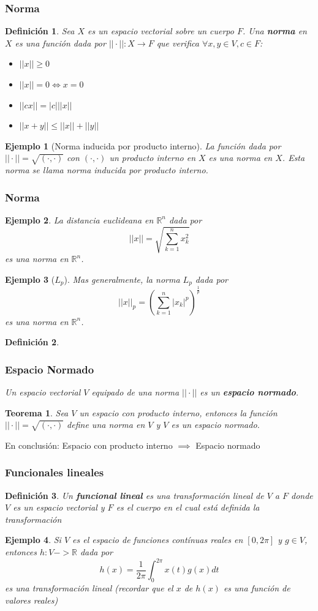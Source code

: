 \documentclass{beamer}
\newtheorem{teo}{Teorema}
\newtheorem{defi}{Definición}
\newtheorem{ejemplo}{Ejemplo}
\begin{document}
\begin{frame}
\frametitle{Norma}
\begin{defi}
Sea $X$ es un espacio vectorial sobre un cuerpo $F$. Una \textbf{norma} en $X$
es una función dada por $|| \cdot || : X \to F$ que verifica $\forall x,y \in V, c \in F$:
\begin{itemize}
\item $||x|| \geq 0$
\item $||x|| = 0 \iff x = 0$
\item $||c x|| = |c| ||x||$
\item $||x + y|| \leq ||x|| + ||y||$
\end{itemize}
\end{defi}
\pause
    \begin{ejemplo}[Norma inducida por producto interno]
        La función dada por $|| \cdot || = \sqrt{( \cdot, \cdot )}$ con $( \cdot, \cdot )$
        un producto interno en $X$ es una norma en $X$. Esta norma
        se llama norma inducida por producto interno.
    \end{ejemplo}
\end{frame}
\begin{frame}
\frametitle{Norma}
\begin{ejemplo}
La distancia euclideana en $\mathbb{R}^n$ dada por
$$
||x|| = \sqrt{\sum_{k=1}^n x_k^2}
$$
es una norma en $\mathbb{R}^n$.
\end{ejemplo}
\pause
\begin{ejemplo}[$L_p$]
Mas generalmente, la norma $L_p$ dada por
$$
||x||_p = (\sum_{k=1}^n |x_k|^p)^{\frac{1}{p}}
$$
es una norma en $\mathbb{R}^n$.
\end{ejemplo}
\end{frame}
\begin{frame}
\begin{defi}
\frametitle{Espacio Normado}
Un espacio vectorial $V$ equipado de una norma $||\cdot||$ es un \textbf{espacio normado}.
\end{defi}
\pause
\begin{teo}
    Sea $V$ un espacio con producto interno, entonces la función $|| \cdot || = \sqrt{( \cdot,\cdot )}$
    define una norma en $V$ y $V$ es un espacio normado.
\end{teo}
\pause
En conclusión:
    Espacio con producto interno $\implies$ Espacio normado
\end{frame}
\begin{frame}
\frametitle{Funcionales lineales}
\begin{defi}
Un \textbf{funcional lineal} es una transformación lineal de $V$ a $F$ donde
$V$ es un espacio vectorial y $F$ es el cuerpo en el cual está definida la transformación
\end{defi}
\pause
\begin{ejemplo}
Si $V$ es el espacio de funciones contínuas reales en $[0,2\pi]$ y $g \in V$, entonces
$h:V -> \mathbb{R}$ dada por
$$
h(x) = \frac{1}{2\pi} \int_0^{2\pi} x(t)g(x) dt
$$
es una transformación lineal (recordar que el $x$ de $h(x)$ es una función de valores reales)
\end{ejemplo}
\end{frame}
\end{document}
